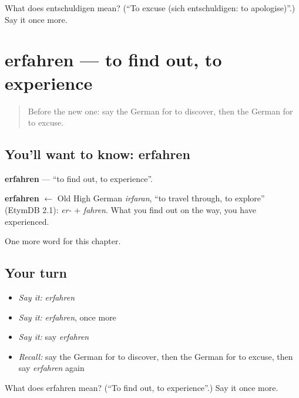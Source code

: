 \begin{tcolorbox}[breakable,colback=teal!4,colframe=teal!35!black,title={Before you move on}]
What does entschuldigen mean? (\textquotedblleft{}To excuse (sich entschuldigen: to apologise)\textquotedblright{}.) Say it once more.
\end{tcolorbox}
\section[erfahren]{erfahren — to find out, to experience}

\label{lesson:GE-C248-erfahren}



\begin{quote}
Before the new one: say the German for to discover, then the German for to excuse.
\end{quote}

\subsection*{You'll want to know: erfahren}
\textbf{erfahren} — \textquotedblleft{}to find out, to experience\textquotedblright{}.

\begin{cousinweb}
\textbf{erfahren} $\leftarrow$ Old High German \emph{irfaran}, \textquotedblleft{}to travel through, to explore\textquotedblright{} (EtymDB 2.1): \emph{er-} + \emph{fahren}. What you find out on the way, you have experienced.
\end{cousinweb}

\begin{grammarlens}[title={What you've built}]
One more word for this chapter.
\end{grammarlens}

\subsection*{Your turn}
\begin{itemize}
\raggedright
  \item \emph{Say it:} \emph{erfahren}
  \item \emph{Say it:} \emph{erfahren}, once more
  \item \emph{Say it:} say \emph{erfahren}
  \item \emph{Recall:} say the German for to discover, then the German for to excuse, then say \emph{erfahren} again
\end{itemize}

\begin{tcolorbox}[breakable,colback=teal!4,colframe=teal!35!black,title={Before you move on}]
What does erfahren mean? (\textquotedblleft{}To find out, to experience\textquotedblright{}.) Say it once more.
\end{tcolorbox}
